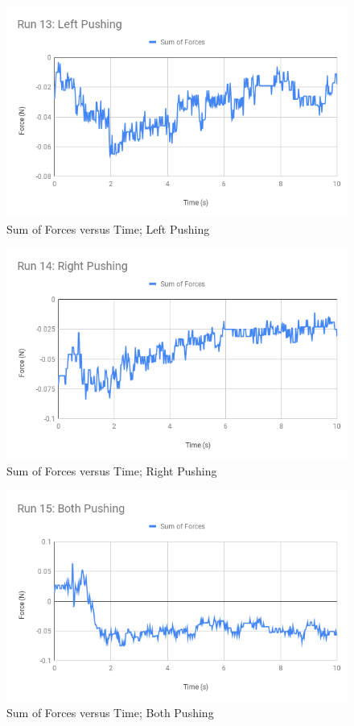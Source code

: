 %
\begin{figure}[ht]
    \centering
    \includegraphics[scale=0.71]{image/05-third-law/Run-13-Left-Pushing.png}
    \caption{Sum of Forces versus Time; Left Pushing}
    \label{figure:05.sf.L}
\end{figure}
%
\begin{figure}[ht]
    \centering
    \includegraphics[scale=0.71]{image/05-third-law/Run-14-Right-Pushing.png}
    \caption{Sum of Forces versus Time; Right Pushing}
    \label{figure:05.sf.R}
\end{figure}
%
\begin{figure}[ht]
    \centering
    \includegraphics[scale=0.71]{image/05-third-law/Run-15-Both-Pushing.png}
    \caption{Sum of Forces versus Time; Both Pushing}
    \label{figure:05.sf.B}
\end{figure}
%
